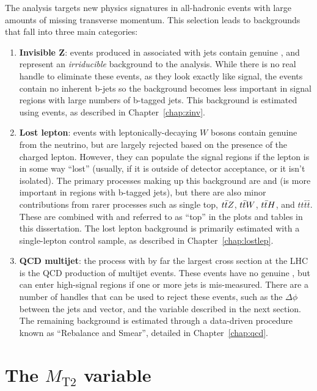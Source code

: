 The \mttwo analysis targets new physics signatures in all-hadronic events with large amounts of missing transverse momentum.
This selection leads to backgrounds that fall into three main categories:
\begin{enumerate}
\item \textbf{Invisible Z}: \znunu events produced in associated with jets contain genuine \ptmiss, and represent
an \emph{irriducible} background to the analysis. While there is no real handle to eliminate these events, as they
look exactly like signal, the events contain no inherent b-jets so the background becomes less important in
signal regions with large numbers of b-tagged jets. This background is estimated using \zll events,
as described in Chapter~\ref{chap:zinv}.
\item \textbf{Lost lepton}: events with leptonically-decaying $W$ bosons contain genuine \ptmiss from the neutrino, 
but are largely rejected based on the presence of the charged lepton.
However, they can populate the signal regions if the lepton is in some way ``lost'' (usually, if it is outside of detector acceptance,
or it isn't isolated). The primary processes making up this background are \ttbar and \wjets (\ttbar is more important in regions
with b-tagged jets), but there are also minor contributions from rarer processes such as single top, $t\bar{t} Z$, $t\bar{t} W$,
$t\bar{t} H$, and $tt\bar{t}\bar{t}$. These are combined with \ttbar and referred to as ``top'' in the plots and tables in this
dissertation. The lost lepton background is primarily estimated with a single-lepton control sample, as described in
Chapter~\ref{chap:lostlep}.
\item \textbf{QCD multijet}: the process with by far the largest cross section at the LHC is the QCD production of
multijet events. These events have no genuine \ptmiss, but can enter high-\ptmiss signal regions if one or more
jets is mis-measured. There are a number of handles that can be used to reject these events, such as the $\Delta\phi$
between the jets and \vMet vector, and the \mttwo variable described in the next section. The remaining background
is estimated through a data-driven procedure known as ``Rebalance and Smear'', detailed in Chapter~\ref{chap:qcd}.
\end{enumerate}

\section{The \texorpdfstring{$M_\text{T2}$}{MT2} variable}
\label{sec:mt2_variable}


